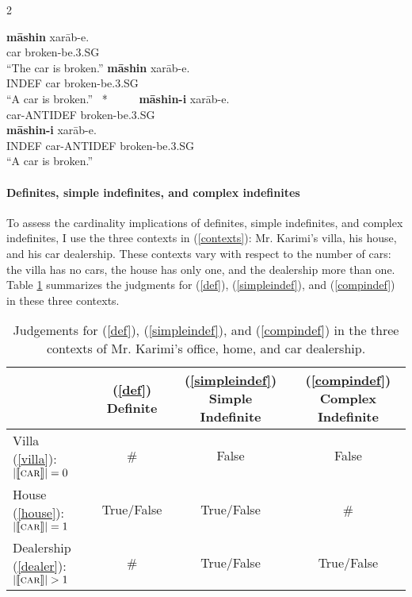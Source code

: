 \documentclass{salt}
\begin{document}
\begin {multicols} {2}	
	\begin {exe}
	\ex \label {defindef} 
	\begin {xlist}
	\ex \label{def}
		\gll	\textbf{m\={a}shin} xar\={a}b-e.\\
			car	broken-be{\scriptsize .3.SG}\\
			``The car is broken.''
		\ex \label{simpleindef}
			 \textbf{m\={a}shin}	xar\={a}b-e.\\
			{\scriptsize INDEF} car 		broken-be{\scriptsize .3.SG}\\
			``A car is broken.''
		\ex \label {antidef}
			\gll	~*~~~~~ \textbf{m\={a}shin-{\color {blue}i}}		xar\={a}b-e.\\
				{}	car-{\scriptsize ANTIDEF} 		broken-{\scriptsize be.3.SG}\\
		\ex \label {compindef}
			 \textbf{m\={a}shin-{\color {blue}i}}			xar\={a}b-e.\\
			{\scriptsize INDEF} car-{\scriptsize ANTIDEF}	broken-{\scriptsize be.3.SG}\\
			``A car is broken.''
	\end {xlist}
	\end {exe}
\end {multicols}

\paragraph{Definites, simple indefinites, and complex indefinites} To assess the cardinality implications of definites, simple indefinites, and complex indefinites, I use the three contexts in (\ref{contexts}): Mr. Karimi's villa, his house, and his car dealership. These contexts vary with respect to the number of cars: the villa has no cars, the house has only one, and the dealership more than one. Table \ref{judge} summarizes the judgments for (\ref{def}), (\ref{simpleindef}), and (\ref{compindef}) in these three contexts.

\begin {table}
\centering
{\small
\begin {tabular} {l | c c c}
 & (\ref{def}) {\scriptsize Definite} & (\ref{simpleindef}) {\scriptsize Simple Indefinite} & (\ref{compindef}) {\scriptsize Complex Indefinite}  \\ \hline
Villa (\ref{villa}): \hfill {\small $| \llbracket \textsc{car} \rrbracket | = 0$} & \#  & False & False \\
House (\ref{house}): \hfill {\small $| \llbracket \textsc{car} \rrbracket | = 1$} & True/False  & True/False & \# \\
Dealership (\ref{dealer}): {\small $| \llbracket \textsc{car} \rrbracket | > 1$} & \# & True/False & True/False \\
\end {tabular}
}
\caption {\footnotesize Judgements for (\ref{def}), (\ref{simpleindef}), and (\ref{compindef}) in the three contexts of Mr. Karimi's office, home, and car dealership.}
\label{judge}
\end {table}
\end{document}
